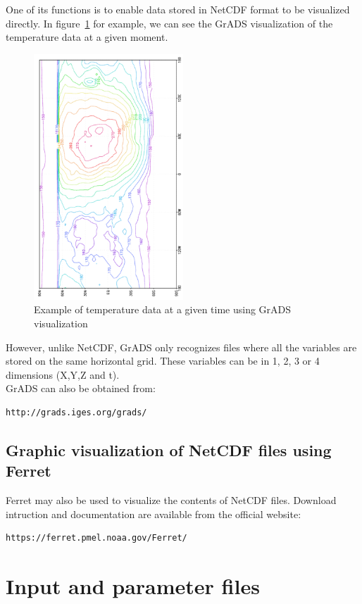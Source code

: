 One of its functions is to enable data stored in NetCDF format to be
visualized directly. In figure~\ref{fg:grads} for example, we can see the
GrADS visualization of the temperature data at a given moment.
%
\begin{figure}
\centering
\includegraphics[width=0.5\textwidth,angle=270]{Fig/grads.pdf}
\caption{Example of temperature data at a given time using
GrADS visualization\label{fg:grads}}
\end{figure}
%
However, unlike NetCDF, GrADS only recognizes files where all the variables are stored on the same horizontal grid.
These variables can be in 1, 2, 3 or 4 dimensions (X,Y,Z and t).\\

GrADS can also be obtained from:
\begin{verbatim}
http://grads.iges.org/grads/
\end{verbatim}

\subsection{Graphic visualization of NetCDF files using Ferret}

Ferret may also be used to visualize the contents of NetCDF files. Download intruction and documentation are available from the official website:
\begin{verbatim}
https://ferret.pmel.noaa.gov/Ferret/
\end{verbatim} 

\section{Input and parameter files}

